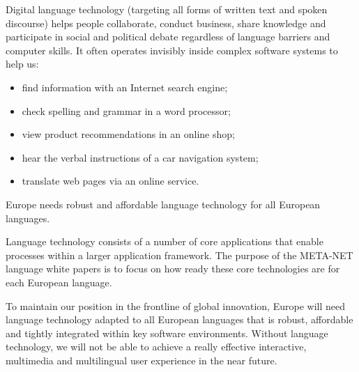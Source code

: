 \documentclass[]{../../metanetpaper}
\begin{document}
\begin{Parallel}[c]{77mm}{77mm}
{Digital language technology (targeting all forms of written text and spoken
discourse) helps people collaborate, conduct business, share knowledge and
participate in social and political debate regardless of language barriers and
computer skills. It often operates invisibly inside complex software systems to
help us:
\begin{itemize}
\item find information with an Internet search engine;

\item check spelling and grammar in a word processor;

\item view product recommendations in an online shop;

\item hear the verbal instructions of a car navigation system;

\item translate web pages via an online service.
\end{itemize}

Europe needs robust and affordable language technology for all European
languages.





Language technology consists of a number of core applications that
enable processes within a larger application framework. The purpose of
the META-NET language white papers is to focus on how ready these core
technologies are for each European language.

To maintain our position in the frontline of global innovation, Europe
will need language technology adapted to all European languages that
is robust, affordable and tightly integrated within key software
environments. Without language technology, we will not be able to
achieve a really effective interactive, multimedia and multilingual
user experience in the near future.
}

\ParallelPar


\end{Parallel}
\end{document}
